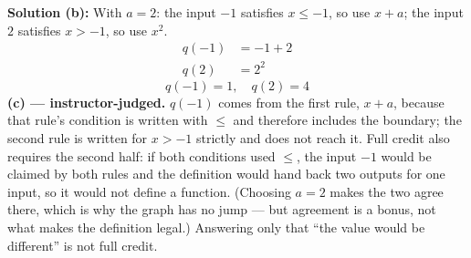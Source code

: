 \documentclass[12pt]{article}
\begin{document}
\textbf{Solution (b):} With $a = 2$: the input $-1$ satisfies $x \le -1$, so use $x + a$; the input $2$ satisfies $x > -1$, so use $x^2$.
\begin{align*}
  q(-1) &= -1 + 2 \\
  q(2) &= 2^2
\end{align*}
\[ \boxed{q(-1) = 1, \quad q(2) = 4} \]
\textbf{(c) --- instructor-judged.} $q(-1)$ comes from the first rule, $x + a$, because that rule's condition is written with $\le$ and therefore includes the boundary; the second rule is written for $x > -1$ strictly and does not reach it. Full credit also requires the second half: if both conditions used $\le$, the input $-1$ would be claimed by both rules and the definition would hand back two outputs for one input, so it would not define a function. (Choosing $a = 2$ makes the two agree there, which is why the graph has no jump --- but agreement is a bonus, not what makes the definition legal.) Answering only that ``the value would be different'' is not full credit.
\end{document}
